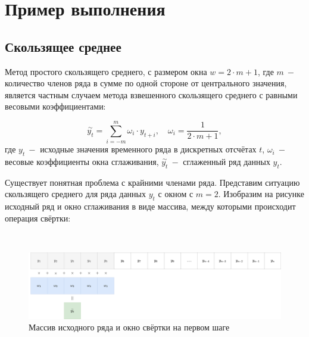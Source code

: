 \documentclass[
]{article}
\begin{document}
\hypertarget{ux43fux440ux438ux43cux435ux440-ux432ux44bux43fux43eux43bux43dux435ux43dux438ux44f}{%
\section{\texorpdfstring{\textbf{Пример
выполнения}}{Пример выполнения}}\label{ux43fux440ux438ux43cux435ux440-ux432ux44bux43fux43eux43bux43dux435ux43dux438ux44f}}

\hypertarget{ux441ux43aux43eux43bux44cux437ux44fux449ux435ux435-ux441ux440ux435ux434ux43dux435ux435}{%
\subsection{\texorpdfstring{\textbf{Скользящее
среднее}}{Скользящее среднее}}\label{ux441ux43aux43eux43bux44cux437ux44fux449ux435ux435-ux441ux440ux435ux434ux43dux435ux435}}

Метод простого скользящего среднего, с размером окна
\(w = 2 \cdot m + 1\), где \(m\ -\) количество членов ряда в сумме по
одной стороне от центрального значения, является частным случаем метода
взвешенного скользящего среднего с равными весовыми коэффициентами:

\[
\overset{\sim}{y_t} = \sum\limits_{i = -m}^{m} \omega_i \cdot y_{t+i}, \quad \omega_i = \frac{1}{2 \cdot m + 1},
\] где \(y_t\ -\) исходные значения временного ряда в дискретных
отсчётах \(t\), \(\omega_i\ -\) весовые коэффициенты окна сглаживания,
\(\overset{\sim}{y_t}\ -\) сглаженный ряд данных \(y_t\).

Существует понятная проблема с крайними членами ряда. Представим
ситуацию скользящего среднего для ряда данных \(y_t\) с окном с
\(m = 2\). Изобразим на рисунке исходный ряд и окно сглаживания в виде
массива, между которыми происходит операция свёртки:

\(\ \)

\begin{figure}
\centering
\includegraphics{Statistics-Свёртка1.drawio.png}
\caption{Массив исходного ряда и окно свёртки на первом шаге}
\end{figure}

\(\ \)
\end{document}
